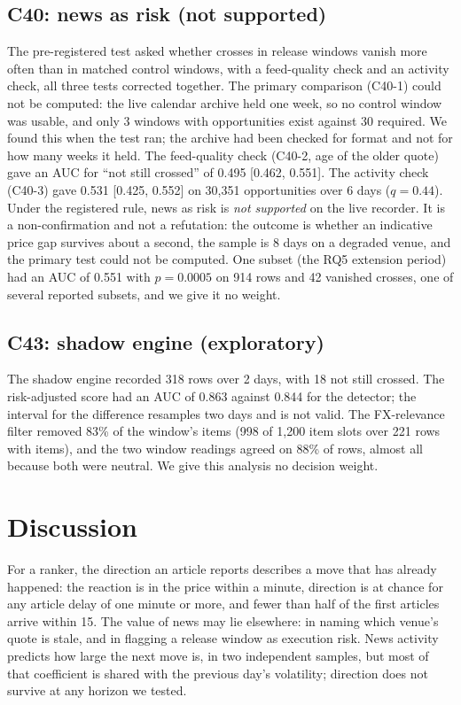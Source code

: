 \documentclass[conference]{IEEEtran}
\begin{document}
\subsection{C40: news as risk (not supported)}
The pre-registered test asked whether crosses in release windows vanish more often than in matched
control windows, with a feed-quality check and an activity check, all three tests corrected together. The primary comparison (C40-1) could not be
computed: the live calendar archive held one week, so no control window was usable, and only 3
windows with opportunities exist against 30 required. We found this when the test ran; the archive
had been checked for format and not for how many weeks it held. The feed-quality check (C40-2,
age of the older quote) gave an AUC for ``not still crossed'' of 0.495 [0.462, 0.551]. The activity
check (C40-3) gave 0.531 [0.425, 0.552] on 30,351 opportunities over 6 days ($q=0.44$). Under the
registered rule, news as risk is \emph{not supported} on the live recorder. It is a non-confirmation
and not a refutation: the outcome is whether an indicative price gap survives about a second, the
sample is 8 days on a degraded venue, and the primary test could not be computed. One subset
(the RQ5 extension period) had an AUC of 0.551 with $p=0.0005$ on 914 rows and 42 vanished crosses,
one of several reported subsets, and we give it no weight.

\subsection{C43: shadow engine (exploratory)}
The shadow engine recorded 318 rows over 2 days, with 18 not still crossed. The risk-adjusted score
had an AUC of 0.863 against 0.844 for the detector; the interval for the difference resamples two
days and is not valid. The FX-relevance filter removed 83\% of the window's items (998 of 1,200
item slots over 221 rows with items), and the two window readings agreed on 88\% of rows, almost
all because both were neutral. We give this analysis no decision weight.

\section{Discussion}
For a ranker, the direction an article reports describes a move that has already happened: the
reaction is in the price within a minute, direction is at chance for any article delay of one
minute or more, and fewer than half of the first articles arrive within 15. The value of news may
lie elsewhere: in naming which venue's quote is stale, and in flagging a release window as
execution risk. News activity predicts how large the next move is, in two independent samples, but
most of that coefficient is shared with the previous day's volatility; direction does not survive
at any horizon we tested.
\end{document}
